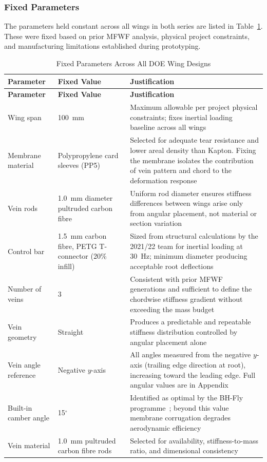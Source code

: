 \subsubsection{Fixed Parameters}

The parameters held constant across all wings in both series are listed in Table~\ref{tab:doe_fixed}. These were fixed based on prior MFWF analysis, physical project constraints, and manufacturing limitations established during prototyping.

\begin{longtable}{||p{4cm}|p{2.5cm}|p{9cm}||}
    \caption{Fixed Parameters Across All DOE Wing Designs}
    \label{tab:doe_fixed} \\
    \hline
    \textbf{Parameter} & \textbf{Fixed Value} & \textbf{Justification} \\
    \hline\hline
    \endfirsthead
    \hline
    \textbf{Parameter} & \textbf{Fixed Value} & \textbf{Justification} \\
    \hline\hline
    \endhead
    \hline
    \endfoot
    \endlastfoot

    Wing span & 100~mm & Maximum allowable per project physical constraints; fixes inertial loading baseline across all wings~\cite{MFWF_FinalReport2021} \\
    \hline
    Membrane material & Polypropylene card sleeves (PP5) & Selected for adequate tear resistance and lower areal density than Kapton. Fixing the membrane isolates the contribution of vein pattern and chord to the deformation response \\
    \hline
    Vein rods & 1.0~mm diameter pultruded carbon fibre & Uniform rod diameter ensures stiffness differences between wings arise only from angular placement, not material or section variation \\
    \hline
    Control bar & 1.5~mm carbon fibre, PETG T-connector (20\% infill) & Sized from structural calculations by the 2021/22 team for inertial loading at 30~Hz; minimum diameter producing acceptable root deflections~\cite{MFWF_FinalReport2021} \\
    \hline
    Number of veins & 3 & Consistent with prior MFWF generations and sufficient to define the chordwise stiffness gradient without exceeding the mass budget \\
    \hline
    Vein geometry & Straight & Produces a predictable and repeatable stiffness distribution controlled by angular placement alone \\
    \hline
    Vein angle reference & Negative $y$-axis & All angles measured from the negative $y$-axis (trailing edge direction at root), increasing toward the leading edge. Full angular values are in Appendix \\
    \hline
    Built-in camber angle & 15$^\circ$ & Identified as optimal by the BH-Fly programme~\cite{bhfly2025}; beyond this value membrane corrugation degrades aerodynamic efficiency \\
    \hline
    Vein material & 1.0~mm pultruded carbon fibre rods & Selected for availability, stiffness-to-mass ratio, and dimensional consistency \\
    \hline
\end{longtable}

